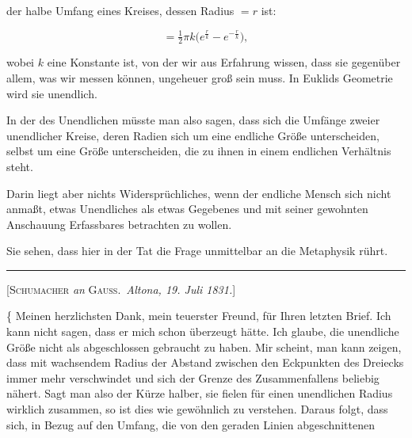 %
der halbe Umfang eines Kreises, dessen Radius $=r$ ist:

\[
=\tfrac{1}{2}\pi k\bigl(e^{\frac{r}{k}}-e^{-\frac{r}{k}}\bigr),
\]

\noindent wobei $k$ eine Konstante ist, von der wir aus Erfahrung wissen, dass sie gegenüber allem, was wir messen können, ungeheuer groß sein muss. In Euklids Geometrie wird sie unendlich.

In der  des Unendlichen müsste man also sagen, dass sich die Umfänge zweier unendlicher Kreise, deren Radien sich um eine endliche Größe unterscheiden, selbst um eine Größe unterscheiden, die zu ihnen in einem endlichen Verhältnis steht.

Darin liegt aber nichts Widersprüchliches, wenn der endliche Mensch sich nicht anmaßt, etwas Unendliches als etwas Gegebenes und mit seiner gewohnten Anschauung Erfassbares betrachten zu wollen.

Sie sehen, dass hier in der Tat die Frage unmittelbar an die Metaphysik rührt.

\bigskip
\rule{4cm}{0.4pt}
\bigskip

\begin{center}
[\textsc{Schumacher} \emph{an} \textsc{Gauss}.\ \emph{Altona, 19. Juli 1831.}]
\end{center}

\smallskip
\{ Meinen herzlichsten Dank, mein teuerster Freund, für Ihren letzten Brief. Ich kann nicht sagen, dass er mich schon überzeugt hätte. Ich glaube, die unendliche Größe nicht als abgeschlossen gebraucht zu haben. Mir scheint, man kann zeigen, dass mit wachsendem Radius der Abstand zwischen den Eckpunkten des Dreiecks immer mehr verschwindet und sich der Grenze des Zusammenfallens beliebig nähert. Sagt man also der Kürze halber, sie fielen für einen unendlichen Radius wirklich zusammen, so ist dies wie gewöhnlich zu verstehen. Daraus folgt, dass sich, in Bezug auf den Umfang, die von den geraden Linien abgeschnittenen
